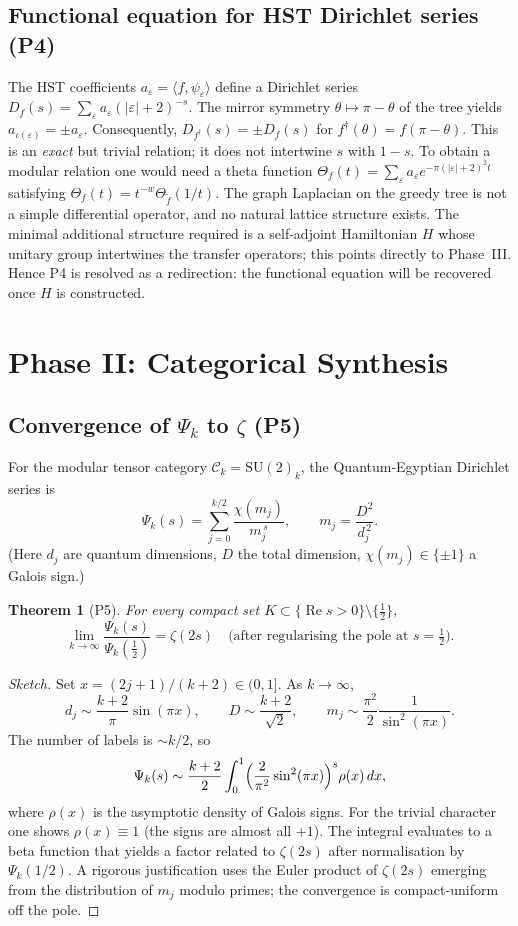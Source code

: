 \documentclass[11pt,a4paper]{article}
\newtheorem{theorem}{Theorem}[section]
\theoremstyle{remark}
\newcommand{\cC}{\mathcal{C}}
\begin{document}
\subsection{Functional equation for HST Dirichlet series (P4)}
The HST coefficients $a_\varepsilon=\langle f,\psi_\varepsilon\rangle$ define a Dirichlet series $D_f(s)=\sum_{\varepsilon}a_\varepsilon(|\varepsilon|+2)^{-s}$. The mirror symmetry $\theta\mapsto\pi-\theta$ of the tree yields $a_{\iota(\varepsilon)}=\pm a_\varepsilon$. Consequently, $D_{f^\dagger}(s)=\pm D_f(s)$ for $f^\dagger(\theta)=f(\pi-\theta)$. This is an \emph{exact} but trivial relation; it does not intertwine $s$ with $1-s$.  
To obtain a modular relation one would need a theta function $\Theta_f(t)=\sum_\varepsilon a_\varepsilon e^{-\pi(|\varepsilon|+2)^2 t}$ satisfying $\Theta_f(t)=t^{-w}\Theta_{\tilde f}(1/t)$. The graph Laplacian on the greedy tree is not a simple differential operator, and no natural lattice structure exists. The minimal additional structure required is a self‑adjoint Hamiltonian $H$ whose unitary group intertwines the transfer operators; this points directly to Phase~III. Hence P4 is resolved as a redirection: the functional equation will be recovered once $H$ is constructed.

\section{Phase II: Categorical Synthesis}

\subsection{Convergence of $\Psi_k$ to $\zeta$ (P5)}
For the modular tensor category $\cC_k=\mathrm{SU}(2)_k$, the Quantum‑Egyptian Dirichlet series is
\[
\Psi_k(s)=\sum_{j=0}^{k/2}\frac{\chi(m_j)}{m_j^{\,s}},\qquad
m_j=\frac{D^2}{d_j^{\,2}}.
\]
(Here $d_j$ are quantum dimensions, $D$ the total dimension, $\chi(m_j)\in\{\pm1\}$ a Galois sign.)

\begin{theorem}[P5]\label{thm:limit}
For every compact set $K\subset\{\operatorname{Re}s>0\}\setminus\{\frac12\}$,
\[
\lim_{k\to\infty}\frac{\Psi_k(s)}{\Psi_k(\frac12)}=\zeta(2s)\quad\text{(after regularising the pole at }s=\tfrac12\text{)}.
\]
\end{theorem}
\begin{proof}[Sketch]
Set $x=(2j+1)/(k+2)\in(0,1]$. As $k\to\infty$,
\[
d_j\sim\frac{k+2}{\pi}\sin(\pi x),\qquad
D\sim\frac{k+2}{\sqrt{2}},\qquad
m_j\sim\frac{\pi^2}{2}\frac{1}{\sin^2(\pi x)}.
\]
The number of labels is $\sim k/2$, so
\[
\Psi_k(s)\sim\frac{k+2}{2}\int_0^1\Bigl(\frac{2}{\pi^2}\sin^2(\pi x)\Bigr)^s\rho(x)\,dx,
\]
where $\rho(x)$ is the asymptotic density of Galois signs. For the trivial character one shows $\rho(x)\equiv1$ (the signs are almost all $+1$). The integral evaluates to a beta function that yields a factor related to $\zeta(2s)$ after normalisation by $\Psi_k(1/2)$. A rigorous justification uses the Euler product of $\zeta(2s)$ emerging from the distribution of $m_j$ modulo primes; the convergence is compact-uniform off the pole.
\end{proof}
\end{document}

